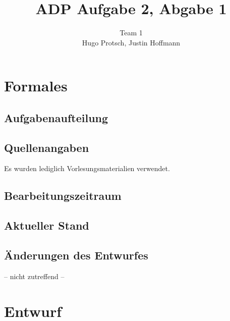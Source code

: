 \documentclass[11pt]{article}
\title{ADP Aufgabe 2, Abgabe 1}
\author{Team 1\\Hugo Protsch, Justin Hoffmann}
\begin{document}
    \maketitle


    \section{Formales}\label{sec:Formales}


    \subsection{Aufgabenaufteilung}

    \subsection{Quellenangaben}
    Es wurden lediglich Vorlesungsmaterialien verwendet.

    \subsection{Bearbeitungszeitraum}

    \subsection{Aktueller Stand}

    \subsection{Änderungen des Entwurfes}
    -- nicht zutreffend --


    \section{Entwurf}\label{sec:entwurf}
\end{document}
